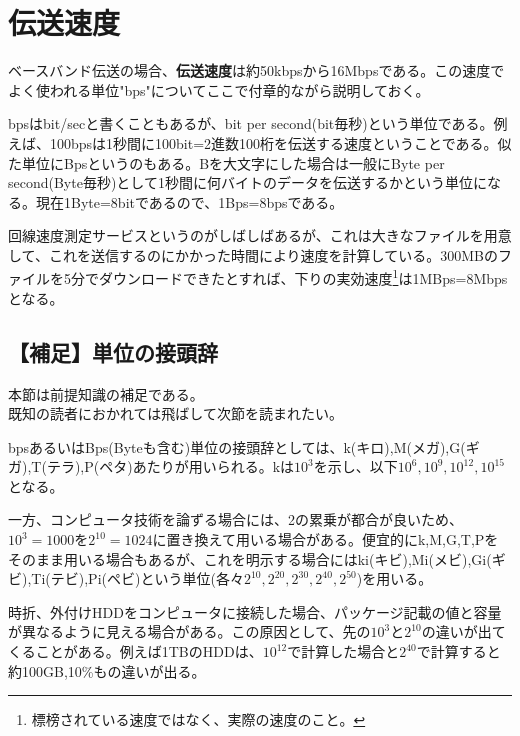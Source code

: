 \section{伝送速度}
ベースバンド伝送の場合、\textbf{伝送速度}は約50kbpsから16Mbpsである。この速度でよく使われる単位"bps"についてここで付章的ながら説明しておく。

bpsはbit/secと書くこともあるが、bit per second(bit毎秒)という単位である。例えば、100bpsは1秒間に100bit=2進数100桁を伝送する速度ということである。似た単位にBpsというのもある。Bを大文字にした場合は一般にByte per second(Byte毎秒)として1秒間に何バイトのデータを伝送するかという単位になる。現在1Byte=8bitであるので、1Bps=8bpsである。

回線速度測定サービスというのがしばしばあるが、これは大きなファイルを用意して、これを送信するのにかかった時間により速度を計算している。300MBのファイルを5分でダウンロードできたとすれば、下りの実効速度\footnote{標榜されている速度ではなく、実際の速度のこと。}は1MBps=8Mbpsとなる。

\subsection{【補足】単位の接頭辞}
\begin{center}
\begin{minipage}[]{0.75\linewidth}
\begin{screen}
\begin{center}
本節は前提知識の補足である。\\
既知の読者におかれては飛ばして次節を読まれたい。
\end{center}
\end{screen}
\end{minipage}
\end{center}

bpsあるいはBps(Byteも含む)単位の接頭辞としては、k(キロ),M(メガ),G(ギガ),T(テラ),P(ペタ)あたりが用いられる。kは$10^3$を示し、以下$10^6,10^9,10^{12},10^{15}$となる。

一方、コンピュータ技術を論ずる場合には、2の累乗が都合が良いため、$10^3=1000$を$2^{10}=1024$に置き換えて用いる場合がある。便宜的にk,M,G,T,Pをそのまま用いる場合もあるが、これを明示する場合にはki(キビ),Mi(メビ),Gi(ギビ),Ti(テビ),Pi(ペビ)という単位(各々$2^{10},2^{20},2^{30},2^{40},2^{50}$)を用いる。

時折、外付けHDDをコンピュータに接続した場合、パッケージ記載の値と容量が異なるように見える場合がある。この原因として、先の$10^3$と$2^{10}$の違いが出てくることがある。例えば1TBのHDDは、$10^{12}$で計算した場合と$2^{40}$で計算すると約100GB,10\%もの違いが出る。

